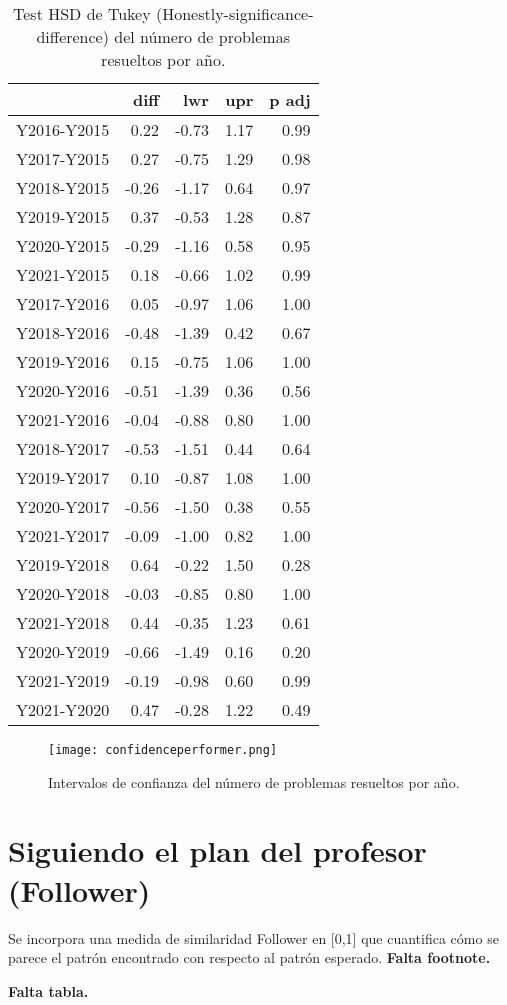 \begin{table}[ht]
\centering
\caption{Test HSD de Tukey (Honestly-significance-difference) del número de problemas resueltos por año.}
\label{tab:Tukeyperformer}
\begin{tabular}{rrrrr}
  \hline
 & diff & lwr & upr & p adj \\ 
  \hline
Y2016-Y2015 & 0.22 & -0.73 & 1.17 & 0.99 \\ 
  Y2017-Y2015 & 0.27 & -0.75 & 1.29 & 0.98 \\ 
  Y2018-Y2015 & -0.26 & -1.17 & 0.64 & 0.97 \\ 
  Y2019-Y2015 & 0.37 & -0.53 & 1.28 & 0.87 \\ 
  Y2020-Y2015 & -0.29 & -1.16 & 0.58 & 0.95 \\ 
  Y2021-Y2015 & 0.18 & -0.66 & 1.02 & 0.99 \\ 
  Y2017-Y2016 & 0.05 & -0.97 & 1.06 & 1.00 \\ 
  Y2018-Y2016 & -0.48 & -1.39 & 0.42 & 0.67 \\ 
  Y2019-Y2016 & 0.15 & -0.75 & 1.06 & 1.00 \\ 
  Y2020-Y2016 & -0.51 & -1.39 & 0.36 & 0.56 \\ 
  Y2021-Y2016 & -0.04 & -0.88 & 0.80 & 1.00 \\ 
  Y2018-Y2017 & -0.53 & -1.51 & 0.44 & 0.64 \\ 
  Y2019-Y2017 & 0.10 & -0.87 & 1.08 & 1.00 \\ 
  Y2020-Y2017 & -0.56 & -1.50 & 0.38 & 0.55 \\ 
  Y2021-Y2017 & -0.09 & -1.00 & 0.82 & 1.00 \\ 
  Y2019-Y2018 & 0.64 & -0.22 & 1.50 & 0.28 \\ 
  Y2020-Y2018 & -0.03 & -0.85 & 0.80 & 1.00 \\ 
  Y2021-Y2018 & 0.44 & -0.35 & 1.23 & 0.61 \\ 
  Y2020-Y2019 & -0.66 & -1.49 & 0.16 & 0.20 \\ 
  Y2021-Y2019 & -0.19 & -0.98 & 0.60 & 0.99 \\ 
  Y2021-Y2020 & 0.47 & -0.28 & 1.22 & 0.49 \\ 
   \hline
\end{tabular}
\end{table}

\begin{figure}[H]
    \centering
    \texttt{[image: confidenceperformer.png]}
    \caption{Intervalos de confianza del número de problemas resueltos por año.}
    \label{fig:confidenceperformer}
\end{figure}

\section{Siguiendo el plan del profesor (Follower)}

Se incorpora una medida de similaridad Follower en [0,1] que cuantifica cómo se parece el patrón encontrado con respecto al patrón esperado. \textbf{Falta footnote.}

\textbf{Falta tabla.}